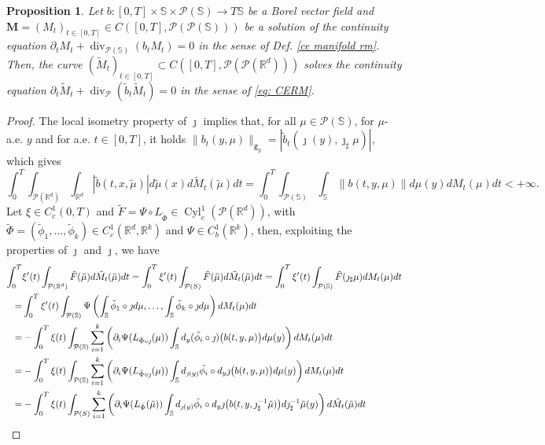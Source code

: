 \documentclass[10pt,leqno]{amsart}
\numberwithin{equation}{section}
\newtheorem{prop}[teorema]{Proposition}
\newcommand{\R}{\mathbb{R}}
\newcommand{\PP}{\mathcal{P}}
\newcommand{\ttg}{\mathtt{g}}
\newcommand{\Ss}{\mathbb{S}}
\begin{document}
\begin{prop}\label{propr: tilde M}
Let $b:[0,T]\times \Ss \times \PP(\Ss) \to T\Ss$ be a Borel vector field and $\boldsymbol{M}=(M_t)_{t\in [0,T]}\in C([0,T],\PP(\PP(\Ss)))$ be a solution of the continuity equation $\partial_tM_t + \operatorname{div}_{\PP(\Ss)}(b_tM_t)=0$ in the sense of Def. \ref{ce manifold rm}. 
Then, the curve $(\tilde{M}_t)_{t\in[0,T]}\subset C([0,T],\PP(\PP(\R^d)))$ solves the continuity equation $\partial_t\tilde{M}_t + \operatorname{div}_\PP(\tilde{b}_t \tilde{M}_t) = 0$ in the sense of \eqref{eq: CERM}.
\end{prop}

\begin{proof}
The local isometry property of $\jmath$ implies that, for all $\mu\in \PP(\Ss)$, for $\mu$-a.e. $y$ and for a.e. $t\in[0,T]$, it holds $\|b_t(y,\mu)\|_{\ttg_{y}} =|\tilde{b}_t(\jmath(y), \jmath_\sharp \mu)|$, which gives
\[\int_0^T \int_{\PP(\R^d)} \int_{\R^d} |\tilde{b}(t,x,\tilde{\mu}) | d\tilde{\mu}(x) d\tilde{M}_t(\tilde{\mu}) dt = \int_0^T \int_{\PP(\Ss)} \int_{\Ss} \|b(t,y,\mu)\|d\mu(y) dM_t(\mu) dt<+\infty.\]
Let $\xi\in C_c^1(0,T)$ and $\tilde{F} = \Psi \circ L_{\tilde{\Phi}} \in \operatorname{Cyl}_c^1(\PP(\R^d))$, with $\tilde{\Phi} = (\tilde{\phi}_1,\dots, \tilde{\phi}_k) \in C^1_c(\R^d, \R^k)$ and $\Psi \in C_b^1(\R^k)$, then, exploiting the properties of $\jmath$ and $\boldsymbol{\jmath}$, we have 
\begin{align*}
    \int_0^T &  \xi'(t) \int_{\PP(\R^d)}\tilde{F}(\tilde{\mu}) d\tilde{M}_t(\tilde{\mu}) dt = 
    \int_0^T \xi'(t) \int_{\PP(S)}\tilde{F}(\tilde{\mu}) d\tilde{M}_t(\tilde{\mu}) dt 
    = 
    \int_0^T \xi'(t) \int_{\PP(\Ss)} \tilde{F}(\jmath_\sharp\mu) dM_t(\mu) dt
    \\
    = & 
    \int_0^T \xi'(t) \int_{\PP(\Ss)} \Psi\left( \int_\Ss \tilde{\phi}_1\circ \jmath d\mu, \dots , \int_\Ss \tilde{\phi}_k\circ \jmath d\mu \right) dM_t(\mu) dt
    \\
    = & 
    -\int_0^T \xi(t) \int_{\PP(\Ss)} \sum_{i=1}^k \left( \partial_i \Psi (L_{\tilde{\Phi} \circ \jmath}(\mu))\int_{\Ss} d_y(\Tilde{\phi_i}\circ \jmath)\big(b(t,y,\mu)\big) d\mu(y)\right) dM_t(\mu) dt
    \\
    = & 
    -\int_0^T \xi(t) \int_{\PP(\Ss)} \sum_{i=1}^k \left(\partial_i \Psi (L_{\tilde{\Phi} \circ \jmath}(\mu))\int_{\Ss} d_{\jmath(y)}\Tilde{\phi_i}\circ d_y\jmath\big(b(t,y,\mu)\big) d\mu(y) \right) dM_t(\mu) dt
    \\
    = & 
    -\int_0^T \xi(t) \int_{\PP(S)} \sum_{i=1}^k \left(\partial_i \Psi (L_{\tilde{\Phi}}(\tilde{\mu}))\int_{\Ss} d_{\jmath(y)}\Tilde{\phi_i}\circ d_y\jmath\big(b(t,y,\jmath^{-1}_\sharp\tilde{\mu})\big) d\jmath^{-1}_\sharp\tilde{\mu}(y) \right) d\tilde{M}_t(\tilde\mu) dt

\end{align*}
\end{proof}
\end{document}
